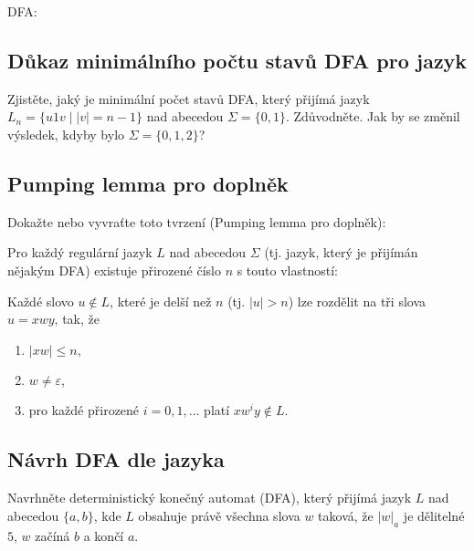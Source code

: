 DFA: 




\subsection{Důkaz minimálního počtu stavů DFA pro jazyk}
Zjistěte, jaký je minimální počet stavů DFA, který přijímá jazyk $L_n = \{u1v \mid |v|=n-1\}$ nad abecedou 
$\Sigma = \{0,1\}$. Zdůvodněte. Jak by se změnil výsledek, kdyby bylo $\Sigma = \{0,1,2\}$?

\subsection{Pumping lemma pro doplněk}
Dokažte nebo vyvraťte toto tvrzení (Pumping lemma pro doplněk):

Pro každý regulární jazyk $L$ nad abecedou $\Sigma$ (tj. jazyk, který je přijímán nějakým DFA) existuje přirozené číslo 
$n$ s touto vlastností:

Každé slovo $u \not\in L$, které je delší než $n$ (tj. $|u| > n$) lze rozdělit na tři slova $u =xwy$, tak, že
\begin{enumerate}[noitemsep]
    \item $|xw| \leq n,$
    \item $w \not= \varepsilon$,
    \item pro každé přirozené $i = 0, 1, ...$ platí $xw^iy \not\in L$.
\end{enumerate}

\subsection{Návrh DFA dle jazyka}
Navrhněte deterministický konečný automat (DFA), který přijímá jazyk $L$ nad abecedou $\{a,b\}$, kde $L$ obsahuje právě 
všechna slova $w$ taková, že $|w|_a$ je dělitelné $5$, $w$ začíná $b$ a končí $a$.


